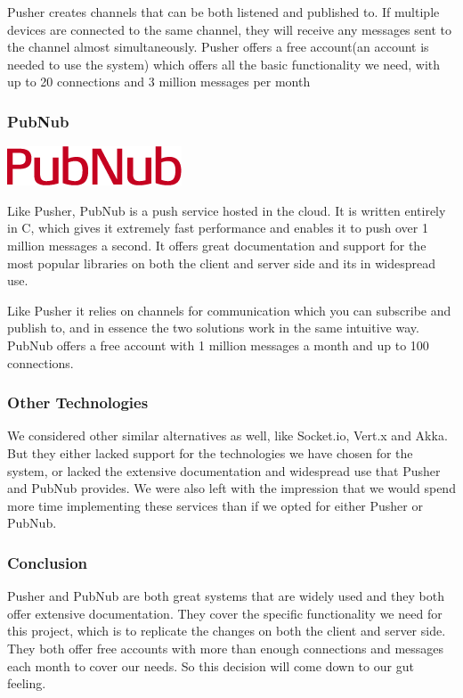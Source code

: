 Pusher creates channels that can be both listened and published to. If multiple devices are connected to the same channel, they will receive any messages sent to the channel almost simultaneously. Pusher offers a free account(an account is needed to use the system) which offers all the basic functionality we need, with up to 20 connections and 3 million messages per month

\subsubsection{PubNub}

\includegraphics[scale=0.4]{image/pubnub-logo.png}

Like Pusher, PubNub is a push service hosted in the cloud. It is written entirely in C, which gives it extremely fast performance and enables it to push over 1 million messages a second. It offers great documentation and support for the most popular libraries on both the client and server side and its in widespread use.

Like Pusher it relies on channels for communication which you can subscribe and publish to, and in essence the two solutions work in the same intuitive way. PubNub offers a free account with 1 million messages a month and up to 100 connections.

\subsubsection{Other Technologies}
We considered other similar alternatives as well, like Socket.io, Vert.x and Akka. But they either lacked support for the technologies we have chosen for the system, or lacked the extensive documentation and widespread use that Pusher and PubNub provides. We were also left with the impression that we would spend more time implementing these services than if we opted for either Pusher or PubNub.

\subsubsection{Conclusion}
Pusher and PubNub are both great systems that are widely used and they both offer extensive documentation. They cover the specific functionality we need for this project, which is to replicate the changes on both the client and server side. They both offer free accounts with more than enough connections and messages each month to cover our needs. So this decision will come down to our gut feeling. 

